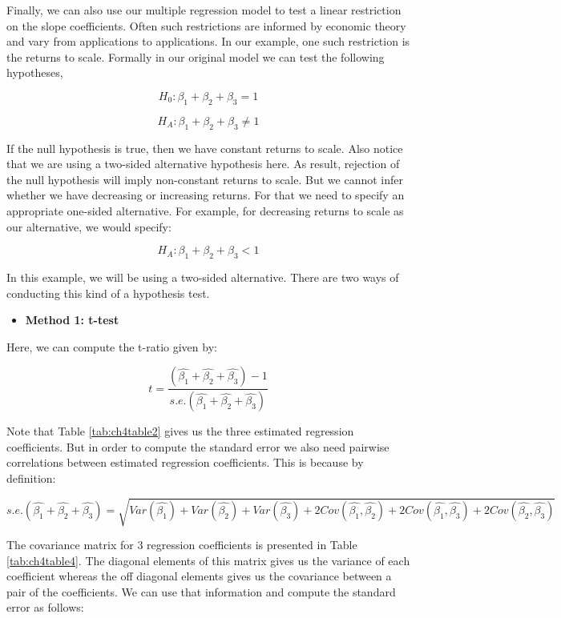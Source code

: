 \documentclass[
]{book}
\providecommand{\tightlist}{%
  \setlength{\itemsep}{0pt}\setlength{\parskip}{0pt}}
\theoremstyle{definition}
\theoremstyle{definition}
\theoremstyle{definition}
\theoremstyle{definition}
\theoremstyle{remark}
\begin{document}
Finally, we can also use our multiple regression model to test a linear restriction on the slope coefficients. Often such restrictions are informed by economic theory and vary from applications to applications. In our example, one such restriction is the returns to scale. Formally in our original model we can test the following hypotheses,

\[H_0: \beta_1+\beta_2 +\beta_3=1\]

\[ H_A: \beta_1+\beta_2 +\beta_3 \neq 1\]

If the null hypothesis is true, then we have constant returns to scale. Also notice that we are using a two-sided alternative hypothesis here. As result, rejection of the null hypothesis will imply non-constant returns to scale. But we cannot infer whether we have decreasing or increasing returns. For that we need to specify an appropriate one-sided alternative. For example, for decreasing returns to scale as our alternative, we would specify:

\[ H_A: \beta_1+\beta_2 +\beta_3 < 1\]

In this example, we will be using a two-sided alternative. There are two ways of conducting this kind of a hypothesis test.

\begin{itemize}
\tightlist
\item
  \textbf{Method 1: t-test}
\end{itemize}

Here, we can compute the t-ratio given by:

\[t= \frac{(\hat{\beta_1}+\hat{\beta_2} +\hat{\beta_3})-1}{s.e.(\hat{\beta_1}+\hat{\beta_2} +\hat{\beta_3})}\]

Note that Table \ref{tab:ch4table2} gives us the three estimated regression coefficients. But in order to compute the standard error we also need pairwise correlations between estimated regression coefficients. This is because by definition:

\[s.e.(\hat{\beta_1}+\hat{\beta_2} +\hat{\beta_3})=\sqrt{Var(\hat{\beta_1})+Var(\hat{\beta_2})+Var(\hat{\beta_3})+2Cov(\hat{\beta_1},\hat{\beta_2})+2Cov(\hat{\beta_1},\hat{\beta_3})+ 2Cov(\hat{\beta_2},\hat{\beta_3})}\]

The covariance matrix for 3 regression coefficients is presented in Table \ref{tab:ch4table4}. The diagonal elements of this matrix gives us the variance of each coefficient whereas the off diagonal elements gives us the covariance between a pair of the coefficients. We can use that information and compute the standard error as follows:
\end{document}
